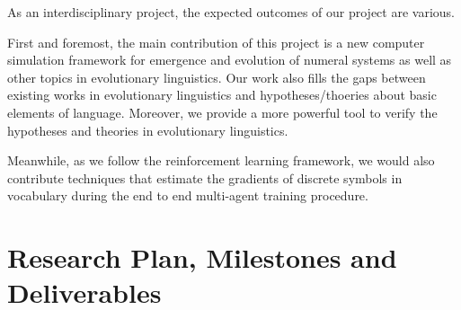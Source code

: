 \documentclass[a4paper,11pt]{article}
\begin{document}
As an interdisciplinary project, the expected outcomes of our project are various.

First and foremost, the main contribution of this project is a new computer simulation framework for emergence and evolution of numeral systems as well as other topics in evolutionary linguistics. Our work also fills the gaps between existing works in evolutionary linguistics and hypotheses/thoeries about basic elements of language. Moreover, we provide a more powerful tool to verify the hypotheses and theories in evolutionary linguistics.

Meanwhile, as we follow the reinforcement learning framework, we would also contribute techniques that estimate the gradients of discrete symbols in vocabulary during the end to end multi-agent training procedure.

%


\section{Research Plan, Milestones and Deliverables}

\end{document}

